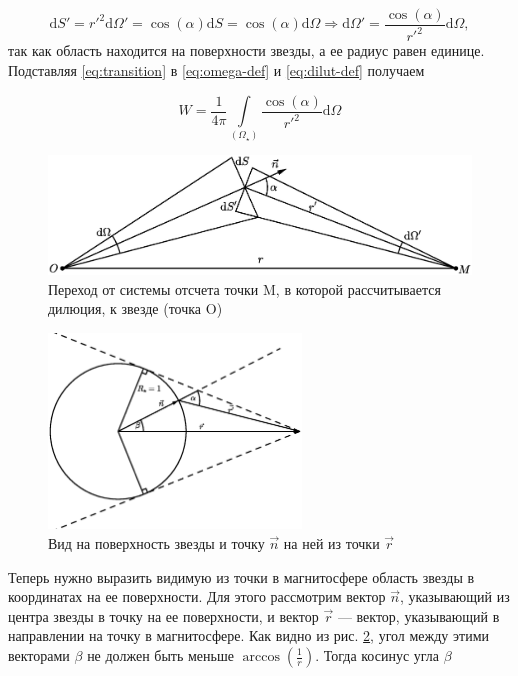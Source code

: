 \documentclass[12pt]{article}
\begin{document}
\begin{equation}\label{eq:transition}
\text{d}S' = r'^2\text{d}\Omega' = \cos(\alpha)\text{d}S = \cos(\alpha)\text{d}\Omega \Rightarrow \text{d}\Omega' = \frac{\cos(\alpha)}{r'^2}\text{d}\Omega,
\end{equation}
так как область находится на поверхности звезды, а ее радиус равен единице. Подставляя \eqref{eq:transition} в \eqref{eq:omega-def} и \eqref{eq:dilut-def} получаем 

\begin{equation}\label{eq:dilut-star}
W = \frac{1}{4\pi}\int\limits_{(\Omega_\star)}\frac{\cos(\alpha)}{r'^2}\text{d}\Omega
\end{equation}

\begin{figure}[h]
\centering
\includegraphics[width=\textwidth]{dilut.eps}
\caption{Переход от системы отсчета точки M, в которой рассчитывается дилюция, к звезде (точка O)}
\label{fig:transition}
\end{figure}

\begin{figure}[h]
\centering
\includegraphics[width=0.6\textwidth]{view.eps}
\caption{Вид на поверхность звезды и точку $\vec{n}$ на ней из точки $\vec{r}$}
\label{fig:star-view}
\end{figure}

Теперь нужно выразить видимую из точки в магнитосфере область звезды в координатах на ее поверхности. Для этого рассмотрим вектор $\vec{n}$, указывающий из центра звезды в точку на ее поверхности, и вектор $\vec{r}$ --- вектор, указывающий в направлении на точку в магнитосфере. Как видно из рис. \ref{fig:star-view}, угол между этими векторами $\beta$ не должен быть меньше $\arccos(\frac{1}{r})$. Тогда косинус угла $\beta$
\end{document}
